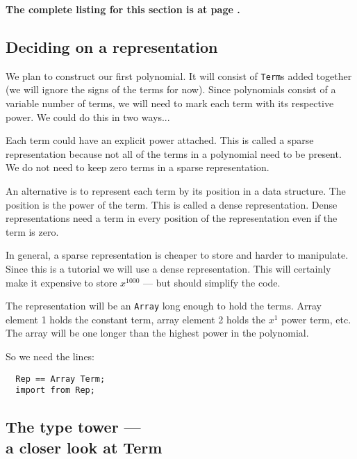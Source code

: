 \vspace{-3mm}

{\bf The complete listing for this section is at page \pageref{PolynomialListing}.}


\vspace{-2mm}
\subsection{Deciding on a representation}

We plan to construct our first polynomial. It will consist of \verb"Term"s
added together (we will ignore the signs of the terms for now). Since
polynomials consist of a variable number of terms, we will need to mark
each term with its respective power. We could do this in two ways...

Each term could have an explicit power attached. This is called a 
sparse representation because not all of the terms in a polynomial need
to be present. We do not need to keep zero terms in a sparse representation.

An alternative is to represent each term by its position in a data 
structure. The position is the power of the term. This is called a 
dense representation. Dense representations need a term in every position
of the representation even if the term is zero.

In general, a sparse representation is cheaper to store and harder
to manipulate. Since this is a tutorial we will use a dense representation.
This will certainly make it expensive to store $x^{1000}$ --- but should simplify
the code.

The representation will be an \verb"Array" long enough to hold the terms.
Array element 1 holds the constant term, array element 2 holds the
$x^1$ power term, etc. The array will be one longer than the highest
power in the polynomial.

So we need the lines:

\begin{small}
\begin{verbatim}
  Rep == Array Term;
  import from Rep;
\end{verbatim}
\end{small}

\subsection{The type tower --- \\ a closer look at Term}

